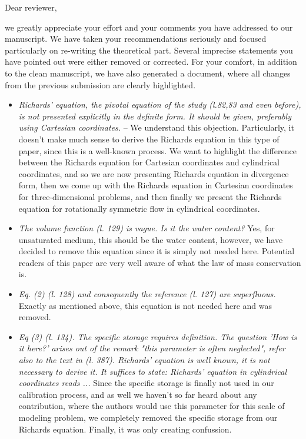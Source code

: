 \documentclass[a4paper,12pt]{letter}
\begin{document}

Dear reviewer,

we greatly appreciate your effort and your comments you have addressed to our manuscript. We have taken your recommendations seriously and focused particularly on re-writing the theoretical part. Several imprecise statements you have pointed out were either removed or corrected. For your comfort, in addition to the clean manuscript, we have also generated a document, where all changes from the previous submission are clearly highlighted.

\begin{itemize}
\item {\it Richards' equation, the pivotal equation of the study (l.82,83 and
  even before), is not presented explicitly in the definite form. It
  should be given, preferably using Cartesian coordinates.} -- We understand this objection. Particularly, it doesn't make much sense to derive the Richards equation in this type of paper, since this is a well-known process. We want to highlight the difference between the Richards equation for Cartesian coordinates and cylindrical coordinates, and so we are now presenting Richards equation in divergence form, then we come up with the Richards equation in Cartesian coordinates for three-dimensional problems, and then finally we present the Richards equation for rotationally symmetric flow in cylindrical coordinates.
  \item {\it  The volume function (l. 129) is vague. Is it the water content?} Yes, for unsaturated medium, this should be the water content, however, we have decided to remove this equation since it is simply not needed here. Potential readers of this paper are very well aware of what the law of mass conservation is.
  \item {\it Eq. (2) (l. 128) and consequently the reference (l. 127) are
  superfluous.} Exactly as mentioned above, this equation is not needed here and was removed.
  \item {\it Eq (3) (l. 134). The specific storage requires definition. The
  question 'How is it here?' arises out of the remark "this parameter
  is often neglected", refer also to the text in (l. 387). Richards'
  equation is well known, it is not necessary to derive it. It suffices
  to state: Richards' equation in cylindrical coordinates reads ...} Since the specific storage is finally not used in our calibration process, and as well we haven't so far heard about any contribution, where the authors would use this parameter for this scale of modeling problem, we completely removed the specific storage from our Richards equation. Finally, it was only creating confussion.

\end{itemize}
\end{document}
